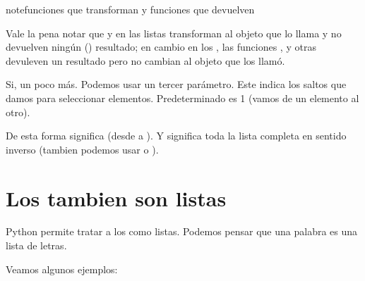 \documentclass[a4paper,12pt,spanish]{sphinxmanual}
\begin{document}
\begin{sphinxadmonition}{note}{funciones que transforman y funciones que devuelven}

\sphinxAtStartPar
Vale la pena notar que  y  en las listas transforman al objeto que lo llama
y no devuelven ningún () resultado; en cambio en los , las funciones ,
 y otras devuleven un resultado pero no cambian al objeto que los llamó.
\end{sphinxadmonition}

\sphinxAtStartPar
{}
Si, un poco más. Podemos usar un tercer parámetro. Este indica los saltos que
damos para seleccionar elementos. Predeterminado es 1 (vamos de un elemento al otro).

\sphinxAtStartPar
De esta forma  significa  (desde  a ).
Y  significa toda la lista completa
en sentido inverso (tambien podemos usar  o ).


\section{Los  tambien son listas}
\label{\detokenize{list:los-strings-tambien-son-listas}}
\sphinxAtStartPar
Python permite tratar a los  como listas.
Podemos pensar que una palabra es una lista de letras.

\sphinxAtStartPar
Veamos algunos ejemplos:

\begin{sphinxVerbatim}[commandchars=\\\{\}]
  
\PYG{p}{[}\PYG{p}{]}
\PYG{p}{[}\PYG{p}{]}
\end{sphinxVerbatim}
\end{document}
